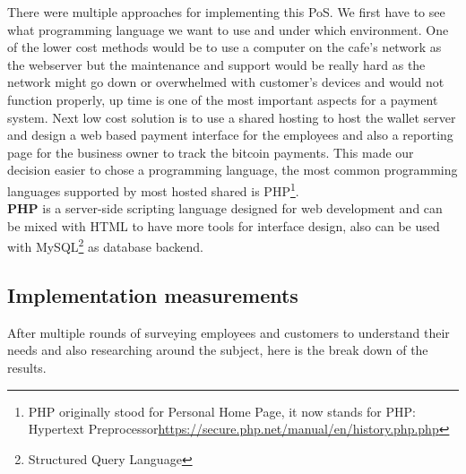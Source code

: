 There were multiple approaches for implementing this PoS. We first have to see what programming language we want to use and under which environment. One of the lower cost methods would be to use a computer on the cafe's network as the webserver but the maintenance and support would be really hard as the network might go down or overwhelmed with customer's devices and would not function properly, up time is one of the most important aspects for a payment system. Next low cost solution is to use a shared hosting to host the wallet server and design a web based payment interface for the employees and also a reporting page for the business owner to track the bitcoin payments. This made our decision easier to chose a programming language, the most common programming languages supported by most hosted shared is PHP\footnote{PHP originally stood for Personal Home Page, it now stands for PHP: Hypertext Preprocessor\url{https://secure.php.net/manual/en/history.php.php}}. 
\\ \textbf{PHP} is a server-side scripting language designed for web development and can be mixed with HTML to have more tools for interface design, also can be used with MySQL\footnote{Structured Query Language} as database backend.

\subsection{Implementation measurements}
After multiple rounds of surveying employees and customers to understand their needs and also researching around the subject, here is the break down of the results.

